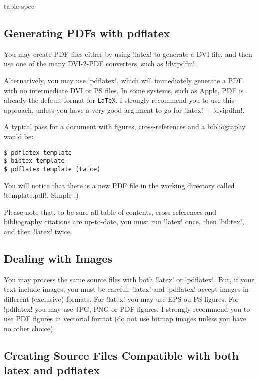 \begin{tabular}[pos]{table spec}
\subsection{Generating PDFs with pdflatex} %
\label{ssec:generating_pdfs_with_pdflatex}

You may create PDF files either by using \spverb!latex! to generate a DVI file, and then use one of the many DVI-2-PDF converters, such as \spverb!dvipdfm!.

Alternatively, you may use \spverb!pdflatex!, which will immediately generate a PDF with no intermediate DVI or PS files. In some systems, such as Apple, PDF is already the default format for \texttt{LaTeX}. I strongly recommend you to use this approach, unless you have a very good argument to go for \spverb!latex! + \spverb!dvipdfm!.

A typical pass for a document with figures, cross-references and a bibliography would be:
\begin{verbatim}
$ pdflatex template
$ bibtex template
$ pdflatex template (twice)
\end{verbatim}
\begin{sloppypar}
    You will notice that there is a new PDF file in the working directory called \spverb!template.pdf!. Simple :)
\end{sloppypar}


Please note that, to be sure all table of contents, cross-references and bibliography citations are up-to-date, you must run \spverb!latex! once, then \spverb!bibtex!, and then \spverb!latex! twice.

\subsection{Dealing with Images} %
\label{sub:dealing_with_images}

You may process the same source files with both \spverb!latex! or \spverb!pdflatex!. But, if your text include images, you must be careful. \spverb!latex! and \spverb!pdflatex! accept images in different (exclusive) formats. For \spverb!latex! you may use EPS ou PS figures. For \spverb!pdflatex! you may use JPG, PNG or PDF figures. I strongly recommend you to use PDF figures in vectorial format (do not use bitmap images unless you have no other choice).

\subsection{Creating Source Files Compatible with both latex and pdflatex} %
\label{ssec:creating_source_files_compatible_with_both_latex_and_pdflatex}


\end{tabular}
